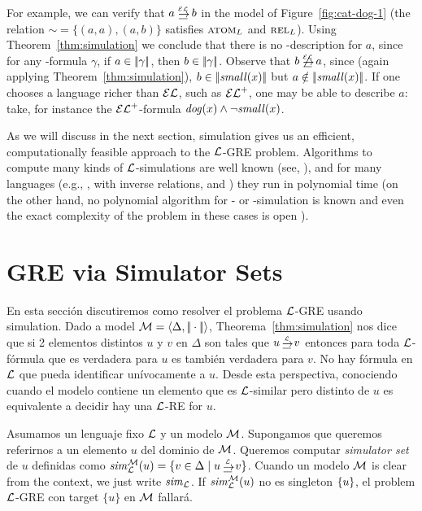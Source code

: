 For example, we can verify that $a \simul{\EL} b$ in the model of
Figure~\ref{fig:cat-dog-1} (the relation ${\sim} = \{(a,a), (a, b) \}
$ satisfies $\textsc{atom}_L$ and $\textsc{rel}_L$).
Using Theorem~\ref{thm:simulation}
we conclude that there is no \EL-description for $a$, since for any \EL-formula $\gamma$,
if $a\in|\!|\gamma|\!|$, then $b\in|\!|\gamma|\!|$.
Observe that $b \not\simul{\EL} a$, since
(again applying Theorem~\ref{thm:simulation}), $b\in|\!|\mathit{small}(x)|\!|$ but
$a\notin|\!|\mathit{small}(x)|\!|$.
%
If one chooses a language richer than $\mathcal{EL}$, such as ${\mathcal{EL}^+}$, one may be
able to describe $a$: take, for instance the ${\mathcal{EL}^+}$-formula
$\mathit{dog}(x)\wedge\lnot\mathit{small}(x)$.


As we will discuss in the next section, simulation gives us an
efficient, computationally feasible approach to the $\mathcal{L}$-GRE
problem. Algorithms to compute many kinds of $\mathcal{L}$-simulations are
well known (see, \cite{H71,PT87,HHK95,DPP03}), and for many
languages  (e.g., \ALC, \ALC with inverse relations,  \ELAN and \EL)
they run in polynomial time (on the other hand, no polynomial
algorithm for \FOL- or \EPFOL-simulation is known and even the exact
complexity of the problem in these cases is open
\cite{gare:comp79}).

\section{GRE via Simulator Sets}\label{sec:simulation}

En esta secci\'on discutiremos como resolver el problema $\mathcal{L}$-GRE
usando simulation. Dado a model $\mathcal{M} = \langle \Delta,
|\!|\cdot|\!| \rangle$, Theorema~\ref{thm:simulation} nos dice que si 2 elementos distintos $u$ y $v$ en $\Delta$ son tales que $u
\simul{\+L} v$ entonces para toda $\mathcal{L}$-f\'ormula que es verdadera para $u$ es tambi\'en verdadera para $v$. No hay f\'ormula en $\mathcal{L}$ que pueda identificar un\'ivocamente a $u$. Desde esta perspectiva, conociendo cuando el modelo contiene un elemento que es $\mathcal{L}$-similar pero distinto de $u$ es
equivalente a decidir hay una $\mathcal{L}$-RE for $u$.


Asumamos un lenguaje fixo $\mathcal{L}$ y un modelo $\mathcal{M}$.  Supongamos que queremos referirnos a un elemento $u$ del dominio de $\mathcal{M}$. Queremos computar \emph{simulator set} de $u$ definidas como
$\simset_{\+L}^{\+M}(u) = \cset{v \in \Delta \mid u \simul{\+L} v}$.
Cuando un modelo $\mathcal{M}$ is clear from the context, we just write
${\it sim}_{\mathcal{L}}$.
 If ${\it sim}_{\mathcal{L}}^{\mathcal{M}}(u)$ no es singleton $\{u\}$,
el problem $\mathcal{L}$-GRE con target $\{u\}$ en $\mathcal{M}$ fallar\'a.

